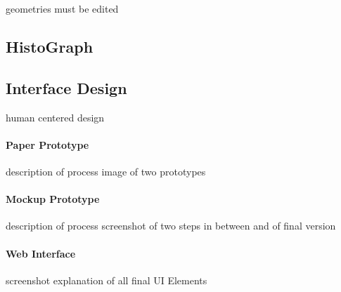 geometries must be edited




\subsection{HistoGraph} %
\label{sub:histograph}




\subsection{Interface Design} %
\label{sub:interface_design}

human centered design

\paragraph{Paper Prototype} %
\label{par:paper_prototype}

description of process
image of two prototypes


\paragraph{Mockup Prototype} %
\label{par:mockup_prototype}

description of process
screenshot of two steps in between and of final version


\paragraph{Web Interface} %
\label{sub:final_version}

screenshot
explanation of all final UI Elements


